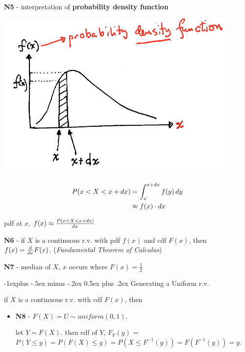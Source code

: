 \documentclass[10pt, landscape]{article}
\makeatletter
\renewcommand{\subsection}{\@startsection{subsection}{2}{0mm}%
  {-1explus -.5ex minus -.2ex}%
  {0.5ex plus .2ex}%
{\normalfont\normalsize\bfseries}}
\makeatother
\begin{document}
\begin{multicols*}{3}
  \textbf{N5} - interpretation of \textbf{probability density function} 

  \begin{minipage}[c]{0.4\linewidth}
    \includegraphics[width=0.9\linewidth]{st2131-pdf.png} 
  \end{minipage}
  \begin{minipage}[c]{0.55\linewidth}
    \begin{align*}
      P(x < X < x + \mathop{dx}) &= \int^{x+\mathop{dx}}_x f(y) \mathop{dy} 
                      \\ &\approx f(x) \cdot \mathop{dx}
    \end{align*}

    pdf at $x$, $f(x) \approx \frac{P(x < X < x + \mathop{dx})}{\mathop{dx}}$
  \end{minipage}

  \textbf{N6} - if $X$ is a continuous r.v. with pdf $f(x)$ and cdf $F(x)$, then $f(x) = \frac{d}{\mathop{dx}}F(x)$. (\textit{Fundamental Theorem of Calculus})

  \textbf{N7} - median of $X$, $x$ occurs where $F(x) = \frac{1}{2}$ 

  \subsection{Generating a Uniform r.v.}

  if $X$ is a continuous r.v. with cdf $F(x)$, then 

  \begin{itemize}
    \item \textbf{N8} - $F(X) = U \sim uniform(0, 1)$.

      \begin{niceproof}
        let $Y = F(X)$. then cdf of $Y$, $F_Y(y)$ = $P(Y \leq y) = P(F(X) \leq y) = P(X \leq F^{-1}(y)) = F(F^{-1}(y)) = y $.
      \end{niceproof}


\end{itemize}
\end{multicols*}
\end{document}
